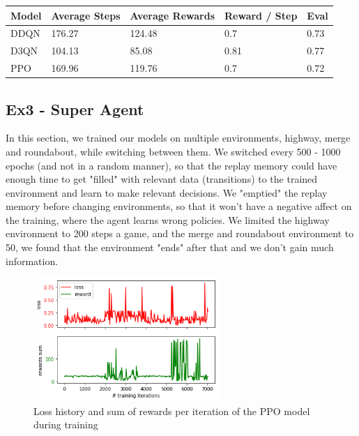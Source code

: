 \documentclass[leqno]{article}
\begin{document}
\begin{multicols}{2}
\begin{tabular}{ |p{1cm}||p{1.5cm}|p{1.5cm}|p{1.2cm}|p{0.8cm}|  }
 \hline
 Model&Average Steps& Average Rewards& Reward / Step&Eval\\
 \hline
 DDQN & 176.27 & 124.48 & 0.7 & 0.73\\
 D3QN & 104.13 & 85.08 & 0.81 & 0.77\\
 PPO & 169.96 & 119.76 &  0.7 & 0.72\\
 \hline
\end{tabular}


\subsection{Ex3 - Super Agent}

In this section, we trained our models on multiple environments, highway, merge and roundabout, while switching between them. We switched every 500 - 1000 epochs (and not in a random manner), so that the replay memory could have enough time to get "filled" with relevant data (transitions) to the trained environment and learn to make relevant decisions. We "emptied" the replay memory before changing environments, so that it won't have a negative affect on the training, where the agent learns wrong policies. We limited the highway environment to 200 steps a game, and the merge and roundabout environment to 50, we found that the environment "ends" after that and we don't gain much information.

\begin{figure}[H]
\centering
    \centering\includegraphics[width=7cm]{figs/ppo_ex3_loss.png}
    \caption{Loss history and sum of rewards per iteration of the PPO model during training}
\end{figure}


\end{multicols}
\end{document}
